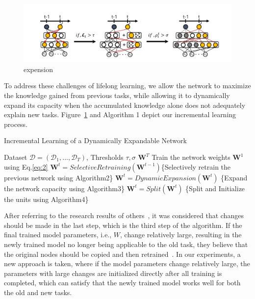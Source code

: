 \begin{figure}[H]
	\centering
	\includegraphics[width=1\linewidth]{figures_ning/den-real}
	\caption[selcted]{expension}
	\label{fig:den-real}
\end{figure}
To address these challenges of lifelong learning, we allow the network to maximize the knowledge gained from previous tasks, while allowing it to dynamically expand its capacity when the accumulated knowledge alone does not adequately explain new tasks. Figure~\ref{fig:den-real} and Algorithm 1 depict our incremental learning process.
\begin{algorithm}[ht]
	\caption{Incremental Learning of a Dynamically Expandable Network}  
	\begin{algorithmic}[1]
		\Require Dataset $\mathcal{D} = (\mathcal{D}_1, \ldots , \mathcal{D}_T )$, Thresholds $\tau,\sigma$
		\Ensure $\bm{W}^T$
		\State Train the network weights $\bm{W}^1$ using Eq.\ref{eq:2}
		\Else
		\State $\bm{W}^t = SelectiveRetraining(\bm{W}^{t-1})$\{Selectively retrain the previous network using Algorithm2\}
		\State $\bm{W}^t = DynamicExpansion(\bm{W}^{t})$ \{Expand the network capacity using Algorithm3\}
		\EndIf
		\State $\bm{W}^t = Split(\bm{W}^t)$ \{Split and Initialize the units using Algorithm4\}
		\EndIf
		\EndFor
	\end{algorithmic} 
\end{algorithm}

After referring to the research results of others~\cite{yoon2017lifelong}, it was considered that changes should be made in the last step, which is the third step of the algorithm. If the final trained model parameters, i.e., $W$, change relatively large, resulting in the newly trained model no longer being applicable to the old task, they believe that the original nodes should be copied and then retrained~\cite{yoon2017lifelong}. In our experiments, a new approach is taken, where if the model parameters change relatively large, the parameters with large changes are initialized directly after all training is completed, which can satisfy that the newly trained model works well for both the old and new tasks.

